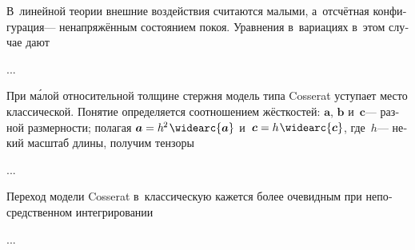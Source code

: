 

\begin{otherlanguage}{russian}

В~линейной теории внешние воздействия считаются малыми, а~отсчётная конфигурация\:--- ненапряжённым состоянием покоя.
Уравнения в~вариациях в~этом случае дают

...



\end{otherlanguage}



\begin{otherlanguage}{russian}

При м\'{а}лой относительной толщине стержня модель типа Cosserat уступает место классической.
Понятие  определяется соотношением жёсткостей: $\bm{a}$, $\bm{b}$ и~$\bm{c}$\:--- разной размерности; полагая ${\bm{a} = h^{\hspace{-0.12ex}2} \hspace{.2ex} \widearc{\bm{a}}}$ и~${\bm{c} = h \hspace{.16ex} \widearc{\bm{c}}}$, где~$h$\:--- некий масштаб длины, получим тензоры

...


Переход модели Cosserat в~классическую кажется более очевидным при непосредственном интегрировании

...



\end{otherlanguage}


